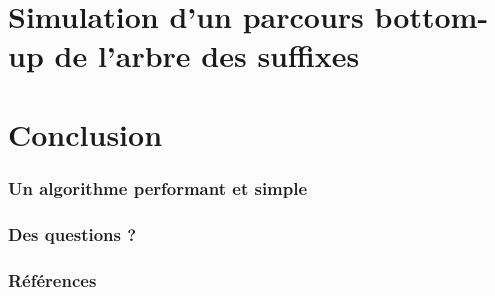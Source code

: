 \documentclass[10pt]{beamer}
\begin{document}


\section{Simulation d'un parcours bottom-up de l'arbre des suffixes}
\label{sec:appbottomup}


\section{Conclusion}
\label{sec:conclusion}

\begin{frame}
  \frametitle{Un algorithme performant et simple}
\end{frame}

\begin{frame}
  \frametitle{Des questions ?}
\end{frame}

\begin{frame}
  \frametitle{Références}
  
  
\end{frame}
\end{document}
